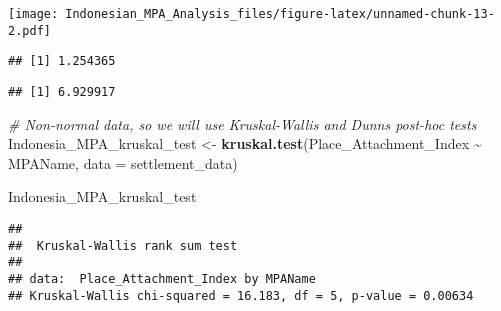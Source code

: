 \documentclass[
]{article}
\newenvironment{Shaded}{\begin{snugshade}}{\end{snugshade}}
\newcommand{\AttributeTok}[1]{\textcolor[rgb]{0.13,0.29,0.53}{#1}}
\newcommand{\CommentTok}[1]{\textcolor[rgb]{0.56,0.35,0.01}{\textit{#1}}}
\newcommand{\FunctionTok}[1]{\textcolor[rgb]{0.13,0.29,0.53}{\textbf{#1}}}
\newcommand{\NormalTok}[1]{#1}
\newcommand{\OtherTok}[1]{\textcolor[rgb]{0.56,0.35,0.01}{#1}}
\newcommand{\SpecialCharTok}[1]{\textcolor[rgb]{0.81,0.36,0.00}{\textbf{#1}}}
\begin{document}
\texttt{[image: Indonesian\_MPA\_Analysis\_files/figure-latex/unnamed-chunk-13-2.pdf]}

\begin{Shaded}
\end{Shaded}

\begin{verbatim}
## [1] 1.254365
\end{verbatim}

\begin{Shaded}
\end{Shaded}

\begin{verbatim}
## [1] 6.929917
\end{verbatim}

\begin{Shaded}
\begin{Highlighting}[]
\CommentTok{\# Non{-}normal data, so we will use Kruskal{-}Wallis and Dunn\textquotesingle{}s post{-}hoc tests}
\NormalTok{Indonesia\_MPA\_kruskal\_test }\OtherTok{\textless{}{-}} \FunctionTok{kruskal.test}\NormalTok{(Place\_Attachment\_Index }\SpecialCharTok{\textasciitilde{}}\NormalTok{ MPAName, }
                                                  \AttributeTok{data =}\NormalTok{ settlement\_data)}

\NormalTok{Indonesia\_MPA\_kruskal\_test}
\end{Highlighting}
\end{Shaded}

\begin{verbatim}
## 
##  Kruskal-Wallis rank sum test
## 
## data:  Place_Attachment_Index by MPAName
## Kruskal-Wallis chi-squared = 16.183, df = 5, p-value = 0.00634
\end{verbatim}

\begin{Shaded}
\end{Shaded}
\end{document}

